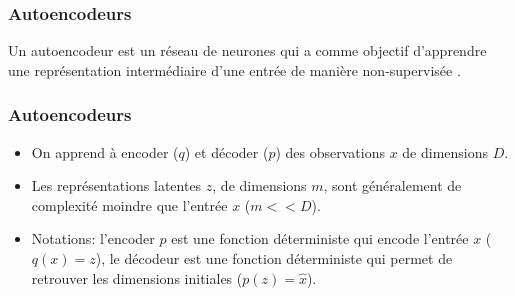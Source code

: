 \documentclass{beamer}
\begin{document}
	\begin{frame}
		\frametitle{Autoencodeurs}
		Un autoencodeur est un réseau de neurones qui a comme objectif d’apprendre une représentation intermédiaire d’une entrée de manière non-supervisée \citep{Goodfellow-et-al-2016}.
	\end{frame}

	\begin{frame}
		\frametitle{Autoencodeurs}
		\begin{itemize}
			\item On apprend à encoder ($q$) et décoder ($p$) des observations $x$ de dimensions $D$.
			\item Les représentations latentes $z$, de dimensions $m$, sont généralement de complexité moindre que l'entrée $x$ ($m << D$).
			\item Notations: l'encoder $p$ est une fonction déterministe qui encode l'entrée $x$ ($q(x) = z$), le décodeur est une fonction déterministe qui permet de retrouver les dimensions initiales ($p(z) = \hat{x}$).
		\end{itemize}
	\end{frame}
\end{document}

